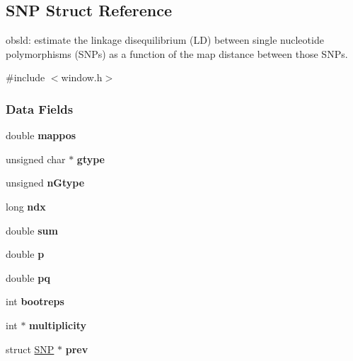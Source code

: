 \hypertarget{struct_s_n_p}{\subsection{S\-N\-P Struct Reference}
\label{struct_s_n_p}
}


obsld\-: estimate the linkage disequilibrium (L\-D) between single nucleotide polymorphisms (S\-N\-Ps) as a function of the map distance between those S\-N\-Ps.  




{\ttfamily \#include $<$window.\-h$>$}

\subsubsection*{Data Fields}
\begin{DoxyCompactItemize}
\item 
\hypertarget{struct_s_n_p_aec7eb36eb6444bfb7df1b391d747ce71}{double {\bfseries mappos}}\label{struct_s_n_p_aec7eb36eb6444bfb7df1b391d747ce71}

\item 
\hypertarget{struct_s_n_p_ab6b5a5a6beb2d76192ad5bbb98d025a3}{unsigned char $\ast$ {\bfseries gtype}}\label{struct_s_n_p_ab6b5a5a6beb2d76192ad5bbb98d025a3}

\item 
\hypertarget{struct_s_n_p_a70c6ef71a984f1298cfbbe45be63327b}{unsigned {\bfseries n\-Gtype}}\label{struct_s_n_p_a70c6ef71a984f1298cfbbe45be63327b}

\item 
\hypertarget{struct_s_n_p_a95dc5ff135e79b4e52ffaad88561243e}{long {\bfseries ndx}}\label{struct_s_n_p_a95dc5ff135e79b4e52ffaad88561243e}

\item 
\hypertarget{struct_s_n_p_acf65db88b6c92c66c30d982b1523966d}{double {\bfseries sum}}\label{struct_s_n_p_acf65db88b6c92c66c30d982b1523966d}

\item 
\hypertarget{struct_s_n_p_a8c1daf7780eb08d784602e86599228c6}{double {\bfseries p}}\label{struct_s_n_p_a8c1daf7780eb08d784602e86599228c6}

\item 
\hypertarget{struct_s_n_p_a2ef58af52fedfc79a2113af55dce5d9e}{double {\bfseries pq}}\label{struct_s_n_p_a2ef58af52fedfc79a2113af55dce5d9e}

\item 
\hypertarget{struct_s_n_p_a0c38be723606fdd53b15b38e21c7a754}{int {\bfseries bootreps}}\label{struct_s_n_p_a0c38be723606fdd53b15b38e21c7a754}

\item 
\hypertarget{struct_s_n_p_a291d4e2023b34d056c0ba24e54cb8c63}{int $\ast$ {\bfseries multiplicity}}\label{struct_s_n_p_a291d4e2023b34d056c0ba24e54cb8c63}

\item 
\hypertarget{struct_s_n_p_a336cce2fcc16f9664377e762e4dc0092}{struct \hyperlink{struct_s_n_p}{S\-N\-P} $\ast$ {\bfseries prev}}\label{struct_s_n_p_a336cce2fcc16f9664377e762e4dc0092}

\end{DoxyCompactItemize}


